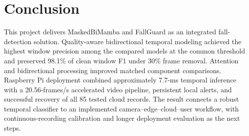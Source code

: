 \section{Conclusion}

This project delivers MaskedBiMamba and FallGuard as an integrated fall-detection solution. Quality-aware bidirectional temporal modeling achieved the highest window precision among the compared models at the common threshold and preserved 98.1\% of clean window F1 under 30\% frame removal. Attention and bidirectional processing improved matched component comparisons. Raspberry Pi deployment combined approximately 7.7-ms temporal inference with a 20.56-frames/s accelerated video pipeline, persistent local alerts, and successful recovery of all 85 tested cloud records. The result connects a robust temporal classifier to an implemented camera--edge--cloud--user workflow, with continuous-recording calibration and longer deployment evaluation as the next steps.
